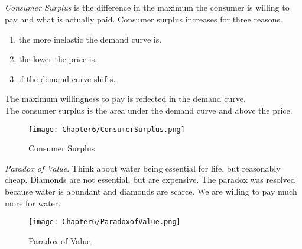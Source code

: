 \subsection{}
\begin{definition}
    \emph{Consumer Surplus} is the difference in the maximum the consumer is willing to pay 
    and what is actually paid. Consumer surplus increases for three reasons.
    \begin{enumerate}
        \item the more inelastic the demand curve is.
        \item the lower the price is.
        \item if the demand curve shifts.
    \end{enumerate}
\end{definition}
The maximum willingness to pay is reflected in the demand curve.\\
The consumer surplus is the area under the demand curve and above the price.
\begin{figure}[H]
    \centering
    \texttt{[image: Chapter6/ConsumerSurplus.png]}
    \caption{Consumer Surplus}
    \label{fig:Consumer_Surplus}
\end{figure}
\begin{definition}
    \emph{Paradox of Value}. Think about water being essential for life, but reasonably cheap. Diamonds are not essential, but are expensive.
    The paradox was resolved because water is abundant and diamonds are scarce. We are willing to pay much more for water.
\end{definition}
\begin{figure}[H]
    \centering
    \texttt{[image: Chapter6/ParadoxofValue.png]}
    \caption{Paradox of Value}
    \label{fig:Paradox_of_Value}
\end{figure}